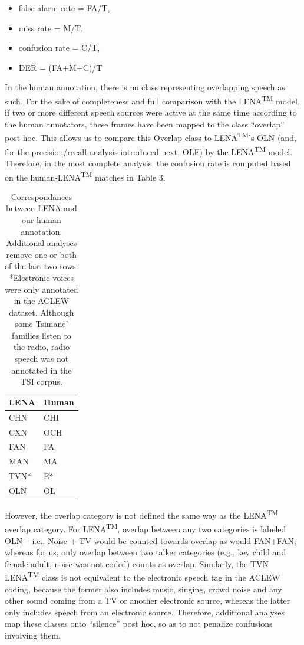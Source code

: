 \documentclass[english,table,man,floatsintext]{apa6}
\providecommand{\tightlist}{%
  \setlength{\itemsep}{0pt}\setlength{\parskip}{0pt}}
\begin{document}
\begin{itemize}
\tightlist
\item
  false alarm rate = FA/T,
\item
  miss rate = M/T,
\item
  confusion rate = C/T,
\item
  DER = (FA+M+C)/T
\end{itemize}

In the human annotation, there is no class representing overlapping speech as such. For the sake of completeness and full comparison with the LENA\textsuperscript{TM} model, if two or more different speech sources were active at the same time according to the human annotators, these frames have been mapped to the class \enquote{overlap} post hoc. This allows us to compare this Overlap class to LENA\textsuperscript{TM}'s OLN (and, for the precision/recall analysis introduced next, OLF) by the LENA\textsuperscript{TM} model. Therefore, in the most complete analysis, the confusion rate is computed based on the human-LENA\textsuperscript{TM} matches in Table 3.

\begin{table}[t]

\caption{\label{tab:tab-tsicor}Correspondances between LENA and our human annotation. Additional analyses remove one or both of the last two rows. *Electronic voices were only annotated in the ACLEW dataset. Although some Tsimane' families listen to the radio, radio speech was not annotated in the TSI corpus.}
\centering
\begin{tabular}{>{\raggedright\arraybackslash}p{2cm}>{\raggedright\arraybackslash}p{2cm}}
\toprule
LENA & Human\\
\midrule
CHN & CHI\\
CXN & OCH\\
FAN & FA\\
MAN & MA\\
TVN* & E*\\
\addlinespace
OLN & OL\\
\bottomrule
\end{tabular}
\end{table}

However, the overlap category is not defined the same way as the LENA\textsuperscript{TM} overlap category. For LENA\textsuperscript{TM}, overlap between any two categories is labeled OLN -- i.e., Noise + TV would be counted towards overlap as would FAN+FAN; whereas for us, only overlap between two talker categories (e.g., key child and female adult, noise was not coded) counts as overlap. Similarly, the TVN LENA\textsuperscript{TM} class is not equivalent to the electronic speech tag in the ACLEW coding, because the former also includes music, singing, crowd noise and any other sound coming from a TV or another electronic source, whereas the latter only includes speech from an electronic source. Therefore, additional analyses map these classes onto \enquote{silence} post hoc, so as to not penalize confusions involving them.
\end{document}
